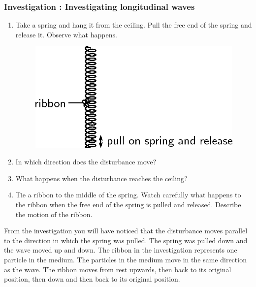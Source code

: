             \subsubsection{  Investigation : Investigating longitudinal waves }
            \nopagebreak
      \label{m38782*id292193}\begin{enumerate}[noitemsep, label=\textbf{\arabic*}. ] 
            \label{m38782*uid1}\item Take a spring and hang it from the ceiling. Pull the free end of the spring and release it. Observe what happens.
    \setcounter{subfigure}{0}
	\begin{figure}[H] %
    \begin{center}
    \label{m38782*id292211!!!underscore!!!media}\label{m38782*id292211!!!underscore!!!printimage}\includegraphics[width=0.55\columnwidth]{col11305.imgs/m38782_PG11C4_002.png} %
      \vspace{2pt}
    \vspace{.1in}
    \end{center}
 \end{figure}       \label{m38782*uid2}\item In which direction does the disturbance move?
\label{m38782*uid3}\item What happens when the disturbance reaches the ceiling?
\label{m38782*uid4}\item Tie a ribbon to the middle of the spring. Watch carefully what happens to the ribbon when the free end of the spring is pulled and released. Describe the motion of the ribbon.
\end{enumerate}
      \label{m38782*id292264}From the investigation you will have noticed that the disturbance moves parallel to the direction in which the spring was pulled. The spring was pulled down and the wave moved up and down. The ribbon in the investigation represents one particle in the medium. The particles in the medium move in the same direction as the wave. The ribbon moves from rest upwards, then back to its original position, then down and then back to its original position.\par 
